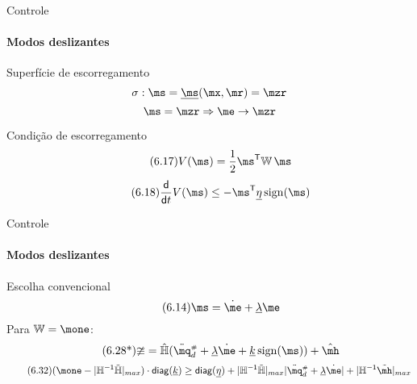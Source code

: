\documentclass[25pt,landscape]{beamer}
\begin{document}
\begin{frame}{Controle}
    \framesubtitle{Modos deslizantes}
    \pause
    \begin{block}{Superfície de escorregamento}
    	\begin{equation*} 
			\sigma: \ms = \underline{\ms}(\mx, \mr) = \mzr
		\end{equation*} \pause
		\begin{equation*}
			\ms = \mzr \Rightarrow \me \rightarrow \mzr
		\end{equation*}
    \end{block}
    \pause
    \begin{block}{Condição de escorregamento}
		\begin{equation} \tag{6.17}
			V(\ms) = \frac{1}{2} \ms^\msT \mW \, \ms
		\end{equation}
		\begin{equation} \label{eq:SlidingCondition} \tag{6.18}
			\frac{\dd}{\dd t} V(\ms)  \leq -   \ms^\msT \underline{\eta} \sign(\ms) 
		\end{equation}
    \end{block}
\end{frame}

\begin{frame}{Controle}
    \framesubtitle{Modos deslizantes}
    \pause
    \begin{block}{Escolha convencional}
    	\begin{equation} \tag{6.14} 
			\ms = \dot{\me} + \underline{\lambda} \me
		\end{equation} 
		\pause
		Para $\mW = \mone$:
		\begin{equation} \tag{6.28*}
			\mup = \hat{\mH}(\ddot{\mq}\ssh_d + \underline{\lambda} \dot{\me} + \underline{k} \sign(\ms) ) + \hat{\mh}
		\end{equation}
		\pause
		\begin{equation} \label{eq:DesigualdadeK2_a1} \tag{6.32}
			(\mone - | \mH^\msI \tilde{\mH}|_{max} ) \cdot \diag(\underline{k})  \geq \diag(\underline{\eta}) + |\mH^\msI \tilde{\mH}|_{max} |\ddot{\mq}\ssh_d + \underline{\lambda} \dot{\me}| + |\mH^\msI\tilde{\mh}|_{max}
		\end{equation}
	$$ $$	
    \end{block}
\end{frame}
\end{document}
